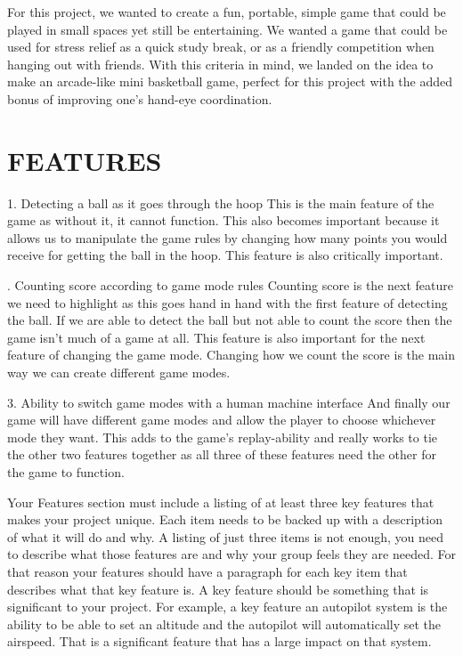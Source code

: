 \documentclass[12pt]{article}
\begin{document}
For this project, we wanted to create a fun, portable, simple game that could be played in small spaces yet still be entertaining. We wanted a game that could be used for stress relief as a quick study break, or as a friendly competition when hanging out with friends. With this criteria in mind, we landed on the idea to make an arcade-like mini basketball game, perfect for this project with the added bonus of improving one's hand-eye coordination. 

\section{FEATURES}
1. Detecting a ball as it goes through the hoop
    This is the main feature of the game as without it, it cannot function. This also becomes important because it allows us to manipulate the game rules by changing how many points you would receive for getting the ball in the hoop. This feature is also critically important.

. Counting score according to game mode rules
	Counting score is the next feature we need to highlight as this goes hand in hand with the first feature of detecting the ball. If we are able to detect the ball but not able to count the score then the game isn't much of a game at all. This feature is also important for the next feature of changing the game mode. Changing how we count the score is the main way we can create different game modes.
 
3. Ability to switch game modes with a human machine interface
	And finally our game will have different game modes and allow the player to choose whichever mode they want. This adds to the game's replay-ability and really works to tie the other two features together as all three of these features need the other for the game to function. 

Your Features section must include a listing of at least three key features that makes your project unique. Each item needs to be backed up with a description of what it will do and why. A listing of just three items is not enough, you need to describe what those features are and why your group feels they are needed. For that reason your features should have a paragraph for each key item that describes what that key feature is. A key feature should be something that is significant to your project. For example, a key feature an autopilot system is the ability to be able to set an altitude and the autopilot will automatically set the airspeed. That is a significant feature that has a large impact on that system.
\end{document}
